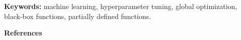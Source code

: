 \documentclass[a4paper,12pt,russian]{article}
\begin{document}
\begin{small}


\textbf{Keywords:} machine learning, hyperparameter tuning, global optimization, black-box functions, partially defined functions.
\newline
\end{small}
\newline
{\large \textbf{References}}
\end{document}
